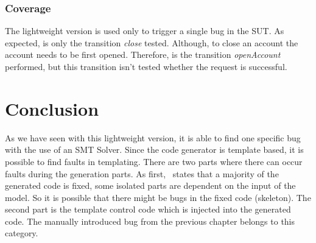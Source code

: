 
\subsubsection{Coverage}
The lightweight version is used only to trigger a single bug in the SUT. As
expected, is only the transition \textit{close} tested. Although, to close an
account the account needs to be first opened. Therefore, is the transition
\textit{openAccount} performed, but this transition isn't tested whether the
request is successful.

\section{Conclusion}

As we have seen with this lightweight version, it is able to find one specific bug with the use of an SMT Solver. Since the code generator is template based, it is possible to find faults in templating. There are two parts where there can occur faults during the generation parts. As first,~\cite[p.274]{voelter2013dsl} states that a majority of the generated code is fixed, some isolated parts are dependent on the input of the model. So it is possible that there might be bugs in the fixed code (skeleton). The second part is the template control code which is injected into the generated code. The manually introduced bug from the previous chapter belongs  to this category.


